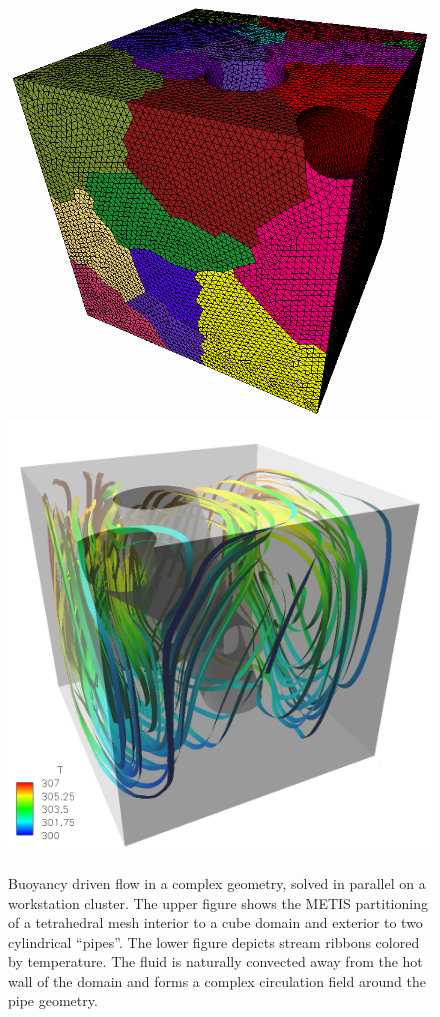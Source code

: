 \documentclass[global,twocolumn,final]{svjour}
\begin{document}
\begin{figure}[hbt]
  \begin{center}
    \includegraphics[width=.65\columnwidth]{figures/part_trans} \\
    \includegraphics[width=.65\columnwidth]{figures/streamtraces}
    \caption{Buoyancy driven flow in a complex geometry, solved
      in parallel on a workstation cluster.  The upper
      figure shows the METIS partitioning of a tetrahedral mesh
      interior to a cube domain and exterior to two
      cylindrical ``pipes''.  The lower figure depicts stream
      ribbons colored by temperature.  The fluid is naturally convected
      away from the hot wall of the domain and forms a complex circulation
      field around the pipe geometry.\label{fig:rayleigh}}
  \end{center}
\end{figure}
\end{document}
